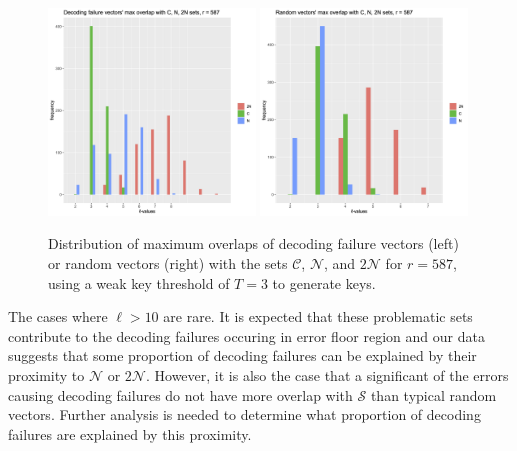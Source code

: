\begin{figure}[htbp]
  \begin{center}
    \includegraphics[width=0.49\textwidth]{2_bike/Rplot-587-df.png}
    \includegraphics[width=0.49\textwidth]{2_bike/Rplot-587-random.png}
  \end{center}
  \caption{Distribution of maximum overlaps of decoding failure vectors (left) or random vectors (right) with the sets $\mathcal{C}$, $\mathcal{N}$, and $2\mathcal{N}$ for $r = 587$, using a weak key threshold of $T = 3$ to generate keys.}
  \label{fig:AtlS}
\end{figure}

The cases where $\ell > 10$ are rare. It is expected that these problematic sets contribute to the decoding failures occuring in error floor region and our data suggests that some proportion of decoding failures can be explained by their proximity to $\mathcal{N}$ or $2\mathcal{N}$. However, it is also the case that a significant of the errors causing decoding failures do not have more overlap with $\mathcal{S}$ than typical random vectors. Further analysis is needed to determine what proportion of decoding failures are explained by this proximity.